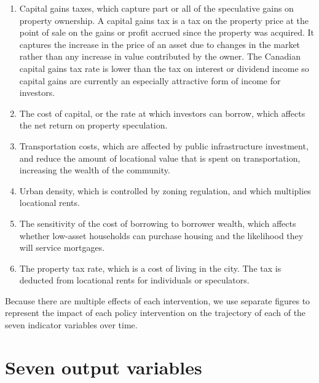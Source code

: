 \begin{enumerate}
\item Capital gains taxes, which capture part or all of the speculative gains on property ownership.  A \gls{capital gains tax}  is a tax on the property price at the point of sale on the gains or profit accrued since the property was acquired. It captures the increase in the price of an asset due to changes in the market rather than any increase in value contributed by the owner. The Canadian capital gains tax rate is lower than the tax on interest or dividend income so capital gains are currently an especially attractive form of income for investors.
\item The cost of capital, or the rate at which investors can borrow, which affects the net return on property speculation.
\item Transportation costs, which are affected by public infrastructure investment, and reduce the amount of locational value that is spent on transportation, increasing the wealth of the community. 
\item Urban density, which is controlled by zoning regulation, and which multiplies locational rents. 
\item The sensitivity of the cost of borrowing to borrower wealth, which affects whether low-asset households can purchase housing and the likelihood they will service mortgages.
\item The property tax rate, which is a cost of living in the city. The tax is deducted from locational rents for individuals or speculators.
\end{enumerate}

Because there are multiple effects of each intervention, we use separate figures to represent the impact of each policy intervention on the trajectory of each of the seven indicator variables over time. %

\section{Seven output variables}

